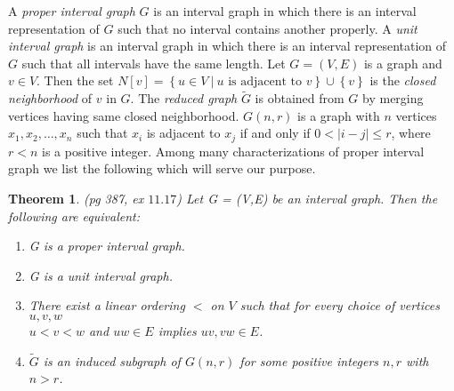\documentclass{article}
\newtheorem{thm}{Theorem}[section]
\theoremstyle{definition}
\numberwithin{equation}{section}
\newcommand{\set}[1]{\left\{#1\right\}}
\newcommand{\Set}[2]{\set{#1\ \vert\ #2}}
\begin{document}


\vspace{0.3em}
\noindent A {\em proper interval graph} $G$ is an interval graph in which there is an interval representation of $G$ such that no interval contains another properly. A {\em unit interval graph} is an interval graph in which there is an interval representation of $G$ such that all intervals have the same length. Let $G=(V,E)$ is a graph and $v\in V$. Then the set $N[v]=\Set{u\in V}{u\text{ is adjacent to } v}\cup\set{v}$ is the {\em closed neighborhood} of $v$ in $G$. The {\em reduced graph} $\tilde{G}$ is obtained from $G$ by merging vertices having same closed neighborhood. $G(n,r)$ is a graph with $n$ vertices $x_{1}, x_{2}, \hdots, x_{n}$ such that $x_{i}$ is adjacent to $x_{j}$ if and only if $0 <|i-j| \leq r$, where $r<n$ is a positive integer. Among many characterizations of proper interval graph we list the following which will serve our purpose. 


\begin{thm} \label{proper1} \cite{West, Looges, Shamik} (pg 387, ex $11.17$) 
Let G = (V,E) be an interval graph. Then the following are equivalent:
\begin{enumerate}
\item G is a proper interval graph.
\item G is a unit interval graph.
\item There exist a linear ordering $<$ on $V$ such that for every choice of vertices $u,v,w$\\ 
$u<v<w$ and $uw\in E$ implies $uv,vw\in E$.
\item $\tilde{G}$ is an induced subgraph of $G(n,r)$ for some positive integers $n,r$ with $n > r$.
\end{enumerate}
\end{thm}
\end{document}
